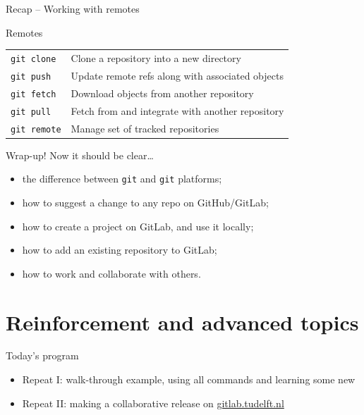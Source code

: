 \documentclass[aspectratio=169]{beamer}
\newcommand{\ato}{\addtocounter{framenumber}{1}}
\newcommand{\code}[1]{\texttt{\color{mygreen}#1}}
\begin{document}
\begin{frame}
  {Recap -- Working with remotes}
  \begin{block}{Remotes}
  \begin{tabular}{ll}
    \code{git clone}  & Clone a repository into a new directory\\
    \code{git push}   & Update remote refs along with associated objects\\
    \code{git fetch}  & Download objects from another repository\\
    \code{git pull}   & Fetch from and integrate with another repository\\
    \code{git remote} & Manage set of tracked repositories\\
  \end{tabular}
  \end{block}

\end{frame}

\begin{frame}
  {Wrap-up! Now it should be clear\ldots}
  \begin{itemize}\itemsep0.2cm
    \item the difference between \code{git} and \code{git} platforms;
    \item how to suggest a change to any repo on GitHub/GitLab;
    \item how to create a project on GitLab, and use it locally;
    \item how to add an existing repository to GitLab;
    \item how to work and collaborate with others.
  \end{itemize}
\end{frame}


\ato %
\section{Reinforcement and advanced topics}

\begin{frame}
  {Today's program}
  \begin{itemize}\itemsep0.5cm
    \item Repeat I: walk-through example, using all commands and learning some
      new
    \item Repeat II: making a collaborative release on
      \href{https://gitlab.tudelft.nl}{gitlab.tudelft.nl}
  \end{itemize}
\end{frame}
\end{document}
